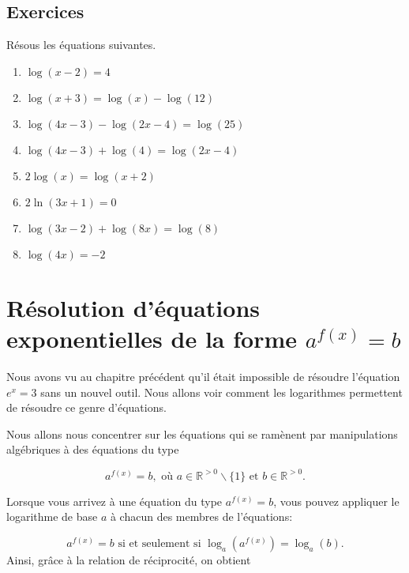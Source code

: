 \documentclass[a4paper,12pt,singlepage]{report}
\newcommand{\IR}{\mathbb{R}}
\begin{document}
\subsection{Exercices}
\label{sec:org7f82d04}
\begin{exercice}
Résous les équations suivantes.

\par \setlength{\columnseprule}{0 pt}
          \begin{minipage}[t]{\linewidth}
          \begin{multicols}{2}
\begin{enumerate}
\item \(\log(x-2)=4\)
\item \(\log(x+3)=\log(x)-\log(12)\)
\item \(\log(4x-3)-\log(2x-4)=\log(25)\)
\item \(\log(4x-3)+\log(4)=\log(2x-4)\)
\item \(2\log(x)=\log(x+2)\)
\item \(2\ln(3x+1)=0\)
\item \(\log(3x-2)+\log(8x)=\log(8)\)
\item \(\log(4x)=-2\)
\end{enumerate}


\end{multicols}\end{minipage}
\end{exercice}
\section{Résolution d'équations exponentielles de la forme \(a^{f(x)}=b\)}
\label{sec:orga04e9a6}

Nous avons vu au chapitre précédent qu'il était impossible de résoudre
l'équation \(e^x=3\) sans un nouvel outil. Nous allons voir comment les
logarithmes permettent de résoudre ce genre d'équations.

Nous allons nous concentrer sur les équations qui se ramènent par manipulations
algébriques à des équations du type

\[
a^{f(x)}=b, \text{ où } a\in\IR^{>0}\backslash\{1\} \text{ et } b\in\IR^{>0}.
\]

Lorsque vous arrivez à une équation du type \(a^{f(x)}=b\), vous pouvez appliquer
le logarithme de base \(a\) à chacun des membres de l'équations:

\[
a^{f(x)}=b\text{ si et seulement si } \log_a(a^{f(x)})=\log_a(b).
\]
Ainsi, grâce à la relation de réciprocité, on obtient
\end{document}

